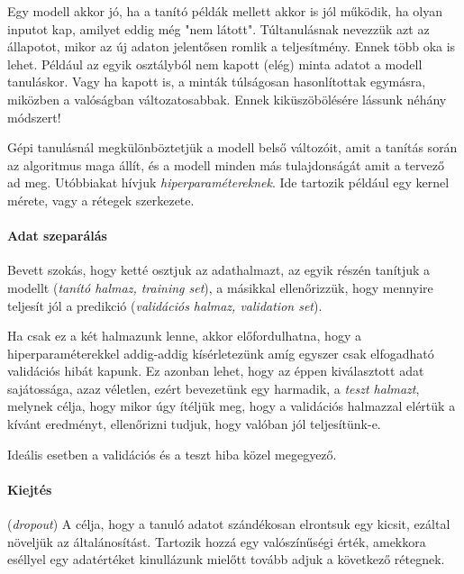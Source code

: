 Egy modell akkor jó, ha a tanító példák mellett akkor is jól működik,
ha olyan inputot kap, amilyet eddig még "nem látott". Túltanulásnak nevezzük
azt az állapotot, mikor az új adaton jelentősen romlik a teljesítmény.
Ennek több oka is lehet. Például az egyik osztályból nem kapott 
(elég) minta adatot a modell tanuláskor. Vagy ha kapott is, a minták túlságosan 
hasonlítottak egymásra, miközben a valóságban változatosabbak.
Ennek kiküszöbölésére lássunk  néhány módszert!




Gépi tanulásnál megkülönböztetjük a modell belső változóit, amit 
a tanítás során az algoritmus maga állít, és a modell minden más tulajdonságát
amit a tervező ad meg. Utóbbiakat hívjuk \textit{hiperparamétereknek}.
Ide tartozik például egy kernel mérete, vagy a rétegek szerkezete.

\paragraph{Adat szeparálás}

Bevett szokás, hogy ketté osztjuk az adathalmazt, az egyik részén tanítjuk a
modellt (\textit{tanító halmaz, training set}), a másikkal ellenőrizzük, hogy mennyire teljesít jól a predikció (\textit{validációs halmaz, validation set}).

Ha csak ez a két halmazunk lenne, akkor előfordulhatna, hogy a hiperparaméterekkel
addig-addig kísérletezünk amíg egyszer csak elfogadható validációs hibát kapunk. 
Ez azonban lehet, hogy az éppen kiválasztott adat sajátossága, azaz véletlen,
ezért bevezetünk egy harmadik, a \textit{teszt halmazt}, melynek célja, hogy
mikor úgy ítéljük meg, hogy a validációs halmazzal elértük a kívánt eredményt,
ellenőrizni tudjuk, hogy valóban jól teljesítünk-e.

Ideális esetben a validációs és a teszt hiba közel megegyező.


\paragraph{Kiejtés} (\textit{dropout})
A célja, hogy a tanuló adatot szándékosan elrontsuk egy kicsit, ezáltal 
növeljük az általánosítást.
Tartozik hozzá egy valószínűségi érték, amekkora eséllyel
egy adatértéket kinullázunk mielőtt tovább adjuk a következő rétegnek.


